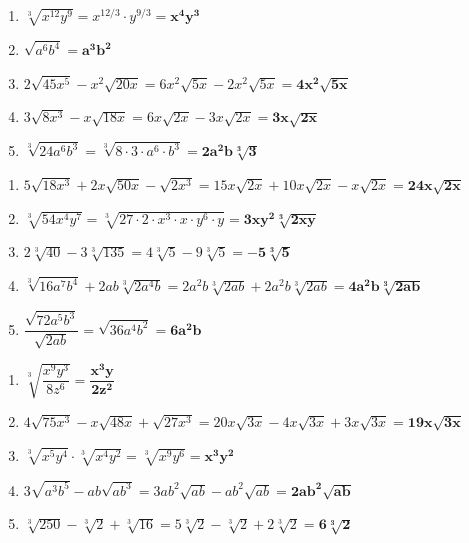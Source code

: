 \documentclass[11pt]{article}
\begin{document}
\vspace{0.5em}

\begin{tcolorbox}[ansbox,title={Part 4 --- Simplify Radicals (6--10)}]
\begin{enumerate}[leftmargin=*,label=\textbf{\arabic*.},itemsep=7pt,start=6]
\item $\sqrt[3]{x^{12}y^9}=x^{12/3}\cdot y^{9/3}=\boldsymbol{x^4y^3}$
\item $\sqrt{a^6b^4}=\boldsymbol{a^3b^2}$
\item $2\sqrt{45x^5}-x^2\sqrt{20x}=6x^2\sqrt{5x}-2x^2\sqrt{5x}=\boldsymbol{4x^2\sqrt{5x}}$
\item $3\sqrt{8x^3}-x\sqrt{18x}=6x\sqrt{2x}-3x\sqrt{2x}=\boldsymbol{3x\sqrt{2x}}$
\item $\sqrt[3]{24a^6b^3}=\sqrt[3]{8\cdot3\cdot a^6\cdot b^3}=\boldsymbol{2a^2b\sqrt[3]{3}}$
\end{enumerate}
\end{tcolorbox}

\vspace{0.5em}

\begin{tcolorbox}[ansbox,title={Part 5 --- Extra Challenge (1--5)}]
\begin{enumerate}[leftmargin=*,label=\textbf{\arabic*.},itemsep=7pt]
\item $5\sqrt{18x^3}+2x\sqrt{50x}-\sqrt{2x^3}=15x\sqrt{2x}+10x\sqrt{2x}-x\sqrt{2x}=\boldsymbol{24x\sqrt{2x}}$
\item $\sqrt[3]{54x^4y^7}=\sqrt[3]{27\cdot2\cdot x^3\cdot x\cdot y^6\cdot y}=\boldsymbol{3xy^2\sqrt[3]{2xy}}$
\item $2\sqrt[3]{40}-3\sqrt[3]{135}=4\sqrt[3]{5}-9\sqrt[3]{5}=\boldsymbol{-5\sqrt[3]{5}}$
\item $\sqrt[3]{16a^7b^4}+2ab\sqrt[3]{2a^4b}=2a^2b\sqrt[3]{2ab}+2a^2b\sqrt[3]{2ab}=\boldsymbol{4a^2b\sqrt[3]{2ab}}$
\item $\dfrac{\sqrt{72a^5b^3}}{\sqrt{2ab}}=\sqrt{36a^4b^2}=\boldsymbol{6a^2b}$
\end{enumerate}
\end{tcolorbox}

\vspace{0.5em}

\begin{tcolorbox}[ansbox,title={Part 5 --- Extra Challenge (6--10)}]
\begin{enumerate}[leftmargin=*,label=\textbf{\arabic*.},itemsep=7pt,start=6]
\item $\sqrt[3]{\dfrac{x^9y^3}{8z^6}}=\boldsymbol{\dfrac{x^3y}{2z^2}}$
\item $4\sqrt{75x^3}-x\sqrt{48x}+\sqrt{27x^3}=20x\sqrt{3x}-4x\sqrt{3x}+3x\sqrt{3x}=\boldsymbol{19x\sqrt{3x}}$
\item $\sqrt[3]{x^5y^4}\cdot\sqrt[3]{x^4y^2}=\sqrt[3]{x^9y^6}=\boldsymbol{x^3y^2}$
\item $3\sqrt{a^3b^5}-ab\sqrt{ab^3}=3ab^2\sqrt{ab}-ab^2\sqrt{ab}=\boldsymbol{2ab^2\sqrt{ab}}$
\item $\sqrt[3]{250}-\sqrt[3]{2}+\sqrt[3]{16}=5\sqrt[3]{2}-\sqrt[3]{2}+2\sqrt[3]{2}=\boldsymbol{6\sqrt[3]{2}}$
\end{enumerate}
\end{tcolorbox}
\end{document}
